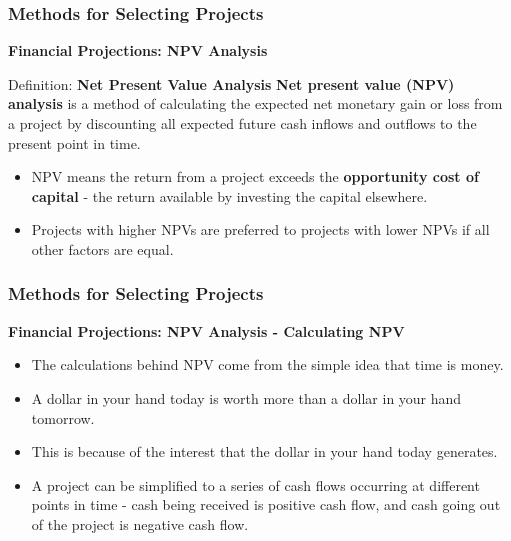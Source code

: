 \documentclass{beamer}
\begin{document}
\begin{frame}
\frametitle{Methods for Selecting Projects}
\textbf{Financial Projections: NPV Analysis}
\vspace{0.5cm}
\begin{block}{Definition: \textbf{Net Present Value Analysis}}
\textbf{Net present value (NPV) analysis} is a method of calculating the expected net monetary gain or loss from a project by discounting all expected future cash inflows and outflows to the present point in time.
\end{block}
\vspace{0.5cm}
\begin{itemize}
\item NPV means the return from a project exceeds the \textbf{opportunity cost of capital} - the return available by investing the capital elsewhere.
\item Projects with higher NPVs are preferred to projects with lower NPVs if all other factors are equal.
\end{itemize}
\end{frame}
\begin{frame}
\frametitle{Methods for Selecting Projects}
\textbf{Financial Projections: NPV Analysis - Calculating NPV}
\vspace{0.5cm}
\begin{itemize}
\item The calculations behind NPV come from the simple idea that time is money.
\item A dollar in your hand today is worth more than a dollar in your hand tomorrow.
\item This is because of the interest that the dollar in your hand today generates.
\item A project can be simplified to a series of cash flows occurring at different points in time - cash being received is positive cash flow, and cash going out of the project is negative cash flow.
\end{itemize}
\end{frame}
\end{document}
